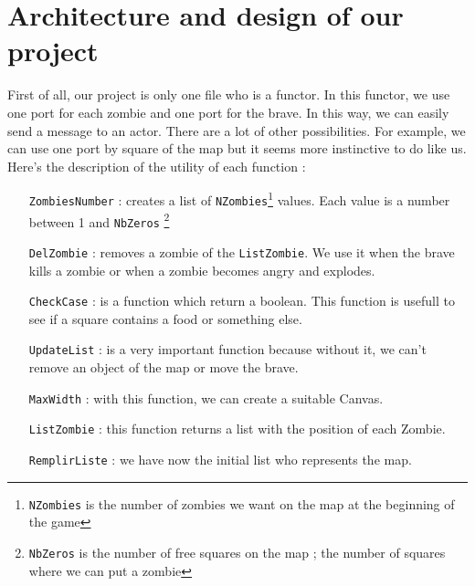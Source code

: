 \section*{Architecture and design of our project}
First of all, our project is only one file who is a functor. In this functor, we use one port for each zombie and one port for the brave. In this way, we can easily send a message to an actor. There are a lot of other possibilities. For example, we can use one port by square of the map but it seems more instinctive to do like us.
\\

Here's the description of the utility of each function :
\\

\begin{itemize}
\item[\texttt{ZombiesNumber} :] creates a list of \texttt{NZombies}\footnote{\texttt{NZombies} is the number of zombies we want on the map at the beginning of the game} values. Each value is a number between 1 and \texttt{NbZeros} \footnote{\texttt{NbZeros} is the number of free squares on the map ; the number of squares where we can put a zombie}
\\

\item[\texttt{DelZombie} :] removes a zombie of the \texttt{ListZombie}. We use it when the brave kills a zombie or when a zombie becomes angry and explodes.
\\

\item[\texttt{CheckCase} :] is a function which return a boolean. This function is usefull to see if a square contains a food or something else.
\\

\item[\texttt{UpdateList} :] is a very important function because without it, we can't remove an object of the map or move the brave.
\\

\item[\texttt{MaxWidth} :] with this function, we can create a suitable Canvas.
\\

\item[\texttt{ListZombie} :] this function returns a list with the position of each Zombie.
\\

\item[\texttt{RemplirListe} :] we have now the initial list who represents the map.
\\


\end{itemize}
